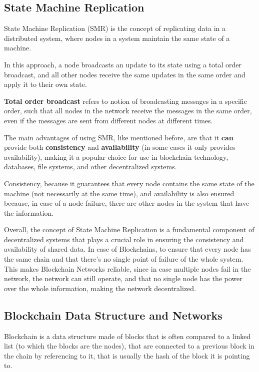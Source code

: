 \subsection*{\textbf{State Machine Replication}}
State Machine Replication (SMR) is the concept of replicating data in a distributed system, where nodes in a system maintain the same state of a machine.

In this approach, a node broadcasts an update to its state using a total order broadcast, and all other nodes receive the same updates in the same order and apply it to their own state.

\textbf{Total order broadcast} refers to notion of broadcasting messages in a specific order, such that all nodes in the network receive the messages in the same order, even if the messages are sent from different nodes at different times.

The main advantages of using SMR, like mentioned before, are that it \textbf{can} provide both \textbf{consistency} and \textbf{availability} (in some cases it only provides availability), making it a popular choice for use in blockchain technology, databases, file systems, and other decentralized systems.

Consistency, because it guarantees that every node contains the same state of the machine (not necessarily at the same time), and availability is also ensured because, in case of a node failure, there are other nodes in the system that have the information.

Overall, the concept of State Machine Replication is a fundamental component of decentralized systems that plays a crucial role in ensuring the consistency and availability of shared data. In case of Blockchains, to ensure that every node has the same chain and that there's no single point of failure of the whole system. This makes Blockchain Networks reliable, since in case multiple nodes fail in the network, the network can still operate, and that no single node has the power over the whole information, making the network decentralized. 


\subsection*{\textbf{Blockchain Data Structure and Networks}}
Blockchain is a data structure made of blocks that is often compared to a linked list (to which the blocks are the nodes), that are connected to a previous block in the chain by referencing to it, that is usually the hash of the block it is pointing to.

